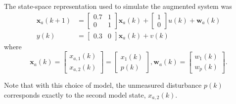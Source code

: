 The state-space representation used to simulate the augmented system was
\begin{equation} \label{eq:sim-sys-siso-ss-aug}
	\begin{split}
	\mathbf{x}_{a}(k+1) & =\left[\begin{array}{cc}
		0.7 & 1 \\
		0 & 1
	\end{array}\right] \mathbf{x}_{a}(k)+\left[\begin{array}{l}
		1 \\
		0
	\end{array}\right] u(k) + \mathbf{w}_{a}(k) \\
	y(k) & =\left[\begin{array}{cc}
	0.3 & 0
\end{array}\right] \mathbf{x}_{a}(k) + v(k)
\end{split}
\end{equation}
where
\begin{equation} \label{eq:sim-sys-siso-ss-aug2}
		\mathbf{x}_{a}(k) = \left[\begin{array}{l}
			x_{a,1}(k) \\
			x_{a,2}(k)
		\end{array}\right] = \left[\begin{array}{l}
		x_{1}(k) \\
		p(k)
	\end{array}\right], \mathbf{w}_{a}(k) = \left[\begin{array}{l}
	w_1(k) \\
	w_{p}(k)
\end{array}\right] .
\end{equation}

Note that with this choice of model, the unmeasured disturbance $p(k)$ corresponds exactly to the second model state, $x_{a,2}(k)$.

